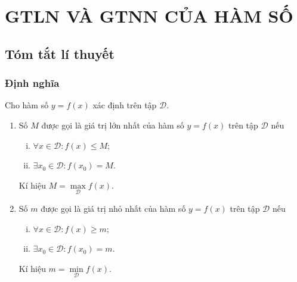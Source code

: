 \section{GTLN VÀ GTNN CỦA HÀM SỐ}
\subsection{Tóm tắt lí thuyết}
\subsubsection{Định nghĩa}
\begin{dn}
	Cho hàm số $y = f(x)$ xác định trên tập $\mathscr{D}$.
	\begin{enumerate}
		\item Số $M$ được gọi là giá trị lớn nhất của hàm số $y = f(x)$ trên tập $\mathscr{D}$ nếu
		\begin{enumerate}[i)]
			\item $\forall x \in \mathscr{D}: f(x) \leq M$;
			\item $\exists x_0 \in \mathscr{D}: f(x_0) = M$.
		\end{enumerate}
		Kí hiệu $M = \max\limits_{\mathscr{D}} f(x)$.
		\item Số $m$ được gọi là giá trị nhỏ nhất của hàm số $y = f(x)$ trên tập $\mathscr{D}$ nếu
		\begin{enumerate}[i)]
			\item $\forall x \in \mathscr{D}: f(x) \geq m$;
			\item $\exists x_0 \in \mathscr{D}: f(x_0) = m$.
		\end{enumerate}
		Kí hiệu $m = \min\limits_{\mathscr{D}} f(x)$.
	\end{enumerate}
\end{dn}

